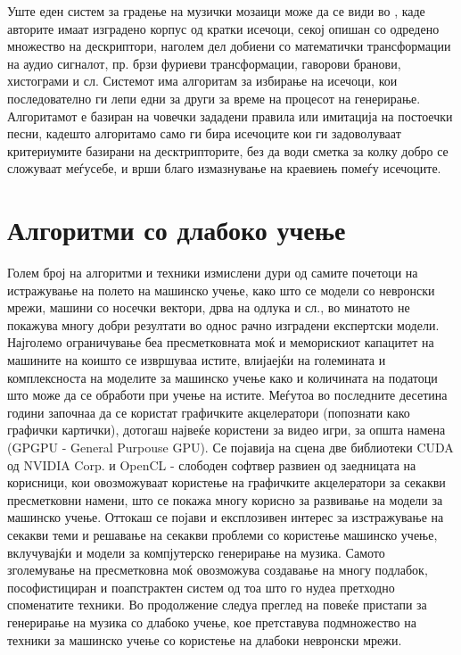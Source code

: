 Уште еден систем за градење на музички мозаици може да се види во \cite{Schwarz2006}, каде авторите имаат изградено корпус од кратки исечоци, секој опишан со одредено множество на дескриптори, наголем дел добиени со математички трансформации на аудио сигналот, пр. брзи фуриеви трансформации, гаворови бранови, хистограми и сл. Системот има алгоритам за избирање на исечоци, кои последователно ги лепи едни за други за време на процесот на генерирање. Алгоритамот е базиран на човечки зададени правила или имитација на постоечки песни, кадешто алгоритамо само ги бира исечоците кои ги задоволуваат критериумите базирани на десктрипторите, без да води сметка за колку добро се сложуваат меѓусебе, и врши благо измазнување на краевиењ помеѓу исечоците.

\section{Алгоритми со длабоко учење} 

Голем број на алгоритми и техники измислени дури од самите почетоци на истражување на полето на машинско учење, како што се модели со невронски мрежи, машини со носечки вектори, дрва на одлука и сл., во минатото не покажува многу добри резултати во однос рачно изградени експертски модели. Најголемо ограничување беа пресметковната моќ и меморискиот капацитет на машините на коишто се извршуваа истите, влијаејќи на големината и комплексноста на моделите за машинско учење како и количината на податоци што може да се обработи при учење на истите. Меѓутоа во последните десетина години започнаа да се користат графичките акцелератори (попознати како графички картички), дотогаш највеќе користени за видео игри, за општа намена (GPGPU - General Purpouse GPU). Се појавија на сцена две библиотеки CUDA од NVIDIA Corp. и OpenCL - слободен софтвер развиен од заедницата на корисници, кои овозможуваат користење на графичките акцелератори за секакви пресметковни намени, што се покажа многу корисно за развивање на модели за машинско учење. Оттокаш се појави и експлозивен интерес за изстражување на секакви теми и решавање на секакви проблеми со користење машинско учење, вклучувајќи и модели за компјутерско генерирање на музика. Самото зголемување на пресметковна моќ овозможува создавање на многу подлабок, пософистициран и поапстрактен систем од тоа што го нудеа претходно споменатите техники. Во продолжение следуа преглед на повеќе пристапи за генерирање на музика со длабоко учење, кое претставува подмножество на техники за машинско учење со користење на длабоки невронски мрежи.

